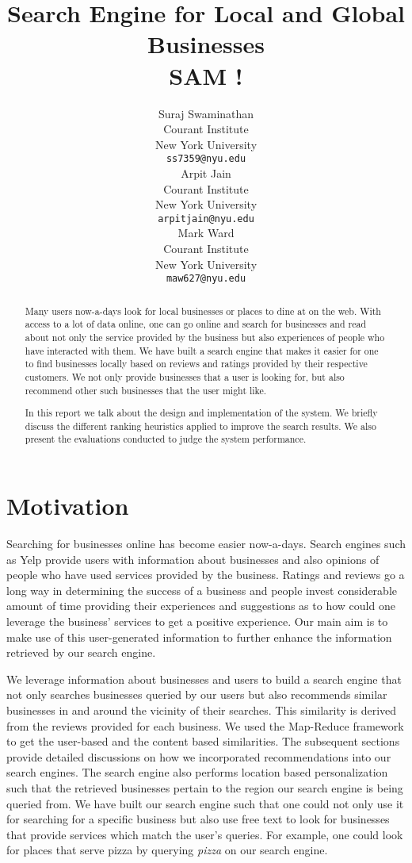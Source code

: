 \documentclass[paper=letter, fontsize=15pt]{article} %
\title{Search Engine for Local and Global Businesses \\ SAM ! }
\author{
Suraj Swaminathan \\
Courant Institute\\
New York University \\
\texttt{ss7359@nyu.edu} \\
\And
Arpit Jain \\
Courant Institute\\
New York University \\
\texttt{arpitjain@nyu.edu} \\
\And
Mark Ward \\
Courant Institute \\
New York University \\
\texttt{maw627@nyu.edu} \\
}
\begin{document}
\maketitle

\begin{abstract}
Many users now-a-days look for local businesses or places to dine at on the web. With access to a lot of data online, one can go online and search for businesses and read about not only the service provided by the business but also experiences of people who have interacted with them. We have built a search engine that makes it easier for one to find businesses locally based on reviews and ratings provided by their respective customers. We not only provide businesses that a user is looking for, but also recommend other such businesses that the user might like. 

In this report we talk about the design and implementation of the system. We briefly discuss the different ranking heuristics applied to improve the search results. We also present the evaluations conducted to judge the system performance. 
\end{abstract}

\section{Motivation}

Searching for businesses online has become easier now-a-days. Search engines such as Yelp \cite{yel} provide users with information about businesses and also opinions of people who have used services provided by the business. Ratings and reviews go a long way in determining the success of a business and people invest considerable amount of time providing their experiences and suggestions as to how could one leverage the business' services to get a positive experience. Our main aim is to make use of this user-generated information to further enhance the information retrieved by our search engine. 


We leverage information about businesses and users to build a search engine that not only searches businesses queried by our users but also recommends similar businesses in and around the vicinity of their searches. This similarity is derived from the reviews provided for each business. We used the Map-Reduce framework to get the user-based and the content based similarities. The subsequent sections provide detailed discussions on how we incorporated recommendations into our search engines. The search engine also performs location based personalization such that the retrieved businesses pertain to the region our search engine is being queried from.
We have built our search engine such that one could not only use it for searching for a specific business but also use free text to look for businesses that provide services which match the user's queries. For example, one could look for places that serve pizza by querying \textit{pizza} on our search engine. 
\end{document}
